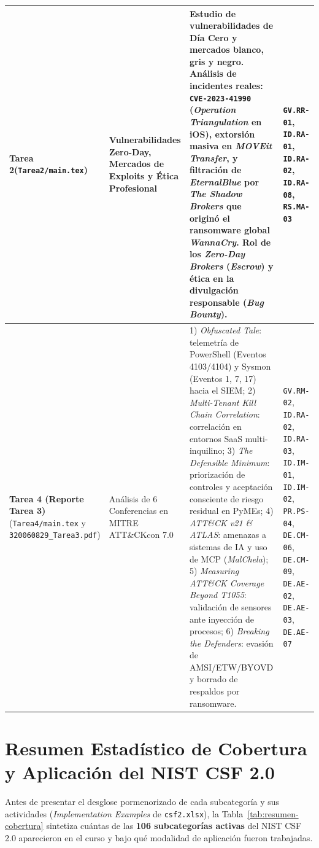 \documentclass[letterpaper,11pt]{article}
\begin{document}
\begin{longtable}{|L{2.8cm}|L{3.5cm}|L{6.2cm}|C{3.8cm}|}
\textbf{Tarea 2}\newline (\texttt{Tarea2/main.tex}) &
Vulnerabilidades Zero-Day, Mercados de Exploits y Ética Profesional &
Estudio de vulnerabilidades de Día Cero y mercados blanco, gris y negro. Análisis de incidentes reales: \texttt{CVE-2023-41990} (\textit{Operation Triangulation} en iOS), extorsión masiva en \textit{MOVEit Transfer}, y filtración de \textit{EternalBlue} por \textit{The Shadow Brokers} que originó el ransomware global \textit{WannaCry}. Rol de los \textit{Zero-Day Brokers} (\textit{Escrow}) y ética en la divulgación responsable (\textit{Bug Bounty}). &
\texttt{GV.RR-01}, \texttt{ID.RA-01}, \texttt{ID.RA-02}, \texttt{ID.RA-08}, \texttt{RS.MA-03} \\
\hline

\textbf{Tarea 4 (Reporte Tarea 3)}\newline (\texttt{Tarea4/main.tex} y \texttt{320060829\_Tarea3.pdf}) &
Análisis de 6 Conferencias en MITRE ATT\&CKcon 7.0 &
1) \textit{Obfuscated Tale}: telemetría de PowerShell (Eventos 4103/4104) y Sysmon (Eventos 1, 7, 17) hacia el SIEM; 2) \textit{Multi-Tenant Kill Chain Correlation}: correlación en entornos SaaS multi-inquilino; 3) \textit{The Defensible Minimum}: priorización de controles y aceptación consciente de riesgo residual en PyMEs; 4) \textit{ATT\&CK v21 \& ATLAS}: amenazas a sistemas de IA y uso de MCP (\textit{MalChela}); 5) \textit{Measuring ATT\&CK Coverage Beyond T1055}: validación de sensores ante inyección de procesos; 6) \textit{Breaking the Defenders}: evasión de AMSI/ETW/BYOVD y borrado de respaldos por ransomware. &
\texttt{GV.RM-02}, \texttt{ID.RA-02}, \texttt{ID.RA-03}, \texttt{ID.IM-01}, \texttt{ID.IM-02}, \texttt{PR.PS-04}, \texttt{DE.CM-06}, \texttt{DE.CM-09}, \texttt{DE.AE-02}, \texttt{DE.AE-03}, \texttt{DE.AE-07} \\
\hline
\end{longtable}
\endgroup

\section{Resumen Estadístico de Cobertura y Aplicación del NIST CSF 2.0}

Antes de presentar el desglose pormenorizado de cada subcategoría y sus actividades (\textit{Implementation Examples} de \texttt{csf2.xlsx}), la Tabla~\ref{tab:resumen-cobertura} sintetiza cuántas de las \textbf{106 subcategorías activas} del NIST CSF 2.0 aparecieron en el curso y bajo qué modalidad de aplicación fueron trabajadas.
\end{document}
